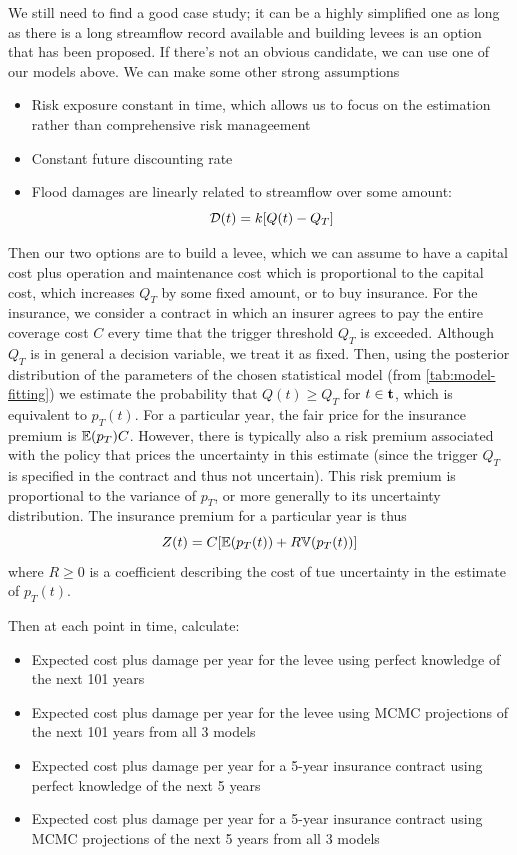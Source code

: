 \documentclass[11pt]{article}
\begin{document}
We still need to find a good case study; it can be a highly simplified one as long as there is a long streamflow record available and building levees is an option that has been proposed.
If there's not an obvious candidate, we can use one of our models above.
We can make some other strong assumptions
\begin{itemize}
  \item Risk exposure constant in time, which allows us to focus on the estimation rather than comprehensive risk manageement
  \item Constant future discounting rate
  \item Flood damages are linearly related to streamflow over some amount:
  \begin{equation}
    \mathcal{D}(t) = k \qty[ Q(t) - Q_T ]
  \end{equation}
\end{itemize}
Then our two options are to build a levee, which we can assume to have a capital cost plus operation and maintenance cost which is proportional to the capital cost, which increases \(Q_T\) by some fixed amount, or to buy insurance.
For the insurance, we consider a contract in which an insurer agrees to pay the entire coverage cost \(C\) every time that the trigger threshold \(Q_T\) is exceeded.
Although \(Q_T\) is in general a decision variable, we treat it as fixed.
Then, using the posterior distribution of the parameters of the chosen statistical model (from \cref{tab:model-fitting}) we estimate the probability that \(Q(t) \geq Q_T\) for \(t \in \vb{t}\), which is equivalent to \(p_T(t)\).
For a particular year, the fair price for the insurance premium is \(\mathbb{E} \qty(p_T) C\).
However, there is typically also a risk premium associated with the policy that prices the uncertainty in this estimate (since the trigger \(Q_T\) is specified in the contract and thus not uncertain).
This risk premium is proportional to the variance of \(p_T\), or more generally to its uncertainty distribution.
The insurance premium for a particular year is thus
\begin{equation} \label{eq:premium}
  Z(t) = C \qty[\mathbb{E} \qty(p_T(t)) + R \mathbb{V} \qty(p_T(t))]
\end{equation}
where \(R \geq 0\) is a coefficient describing the cost of tue uncertainty in the estimate of \(p_T(t)\).

Then at each point in time, calculate:
\begin{itemize}
  \item Expected cost plus damage per year for the levee using perfect knowledge of the next 101 years
  \item Expected cost plus damage per year for the levee using MCMC projections of the next 101 years from all 3 models
  \item Expected cost plus damage per year for a 5-year insurance contract using perfect knowledge of the next 5 years
  \item Expected cost plus damage per year for a 5-year insurance contract using MCMC projections of the next 5 years from all 3 models
\end{itemize}
\end{document}
